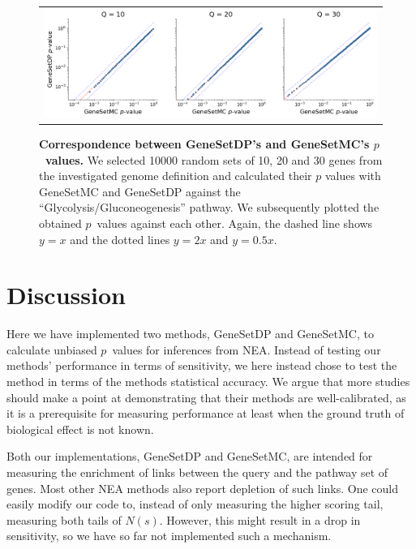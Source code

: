 \documentclass[10pt,letterpaper]{article}
\begin{document}
\begin{figure}[htb]
  \begin{center}
		  \begin{tabular}[t]{c}
				\includegraphics[width=.9\textwidth]{figures/scatter_dp_mc.png}
		\end{tabular}
  \end{center}
  \caption{{\bf Correspondence between GeneSetDP's and GeneSetMC's $p$~values.} We selected 10000 random sets of 10, 20 and 30 genes from the investigated genome definition and calculated their $p$ values with GeneSetMC and GeneSetDP against the ``Glycolysis/Gluconeogenesis'' pathway. We subsequently plotted the obtained $p$~values against each other. Again, the dashed line shows $y = x$ and the dotted lines $y = 2x$ and $y = 0.5x$.}
  \label{fig:pscatter}
\end{figure}



\section*{Discussion}

Here we have implemented two methods, GeneSetDP and GeneSetMC, to calculate unbiased $p$~values for inferences from NEA.
Instead of testing our methods' performance in terms of sensitivity, we here instead chose to test the method in terms of the methods statistical accuracy. We argue that more studies should make a point at demonstrating that their methods are well-calibrated, as it is a prerequisite for measuring performance at least when the ground truth of biological effect is not known.

Both our implementations, GeneSetDP and GeneSetMC, are intended for measuring the enrichment of links between the query and the pathway set of genes. Most other NEA methods also report depletion of such links. One could easily modify our code to, instead of only measuring the higher scoring tail, measuring both tails of $N(s)$. However, this might result in a drop in sensitivity, so we have so far not implemented such a mechanism.
\end{document}

